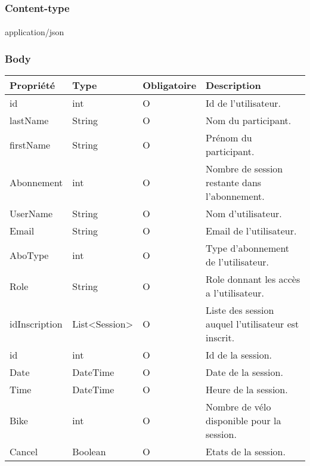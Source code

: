 	\subsubsection{Content-type}
		\paragraph{}
			application/json
	
	\subsubsection{Body}
		\begin{center}
			\begin{tabularx}{\textwidth}{| T{0.2122\textwidth} | S{0.22\textwidth} | S{0.15\textwidth} | S{0.3\textwidth} |}
				\hline
				Propriété & Type & Obligatoire & Description \\
				\hline
				id & int & O & Id de l'utilisateur. \\
				\hline
				lastName & String & O & Nom du participant. \\
				\hline
				firstName & String & O & Prénom du participant. \\
				\hline
				Abonnement & int & O & Nombre de session restante dans l'abonnement. \\
				\hline
				UserName & String & O & Nom d'utilisateur. \\
				\hline
				Email & String & O & Email de l'utilisateur. \\
				\hline
				AboType & int & O & Type d'abonnement de l'utilisateur. \\
				\hline
				Role & String & O & Role donnant les accès a l'utilisateur. \\ 
				\hline
				idInscription & List<Session> & O & Liste des session auquel l'utilisateur est inscrit. \\
				\hline
				
				\hline
				
				\hline
				id & int & O & Id de la session. \\
				\hline
				Date & DateTime & O & Date de la session. \\
				\hline
				Time & DateTime & O & Heure de la session. \\
				\hline
				Bike & int & O & Nombre de vélo disponible pour la session. \\
				\hline
				Cancel & Boolean & O & Etats de la session. \\
				\hline

			\end{tabularx}
		\end{center}
		
